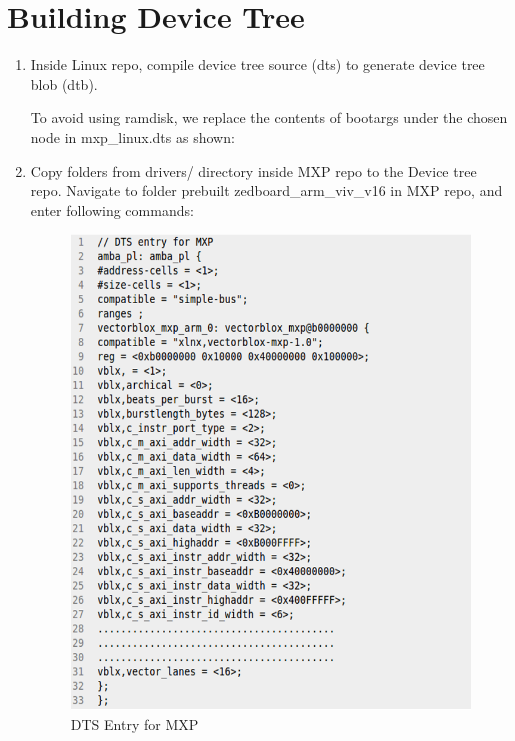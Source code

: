 \section{Building Device Tree}

\begin{enumerate}
	\item Inside Linux repo, compile device tree source (dts) to generate device tree blob (dtb).

		
	
	To avoid using ramdisk, we replace the contents of bootargs under the chosen node in mxp\_linux.dts as shown:
	
		
		
	\item Copy folders from drivers/ directory inside MXP repo to the Device tree repo. Navigate to folder prebuilt zedboard\_arm\_viv\_v16 in MXP repo, and enter following commands:
	
			
			
			\begin{figure}
				\centering
				\includegraphics[width=1\textwidth]{images/c4.png}
				\caption{DTS Entry for MXP}
				\label{dts:blk}
			\end{figure}
			

\end{enumerate}
